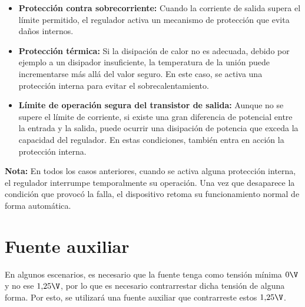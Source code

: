   \begin{itemize}
      \item \textbf{Protección contra sobrecorriente:} Cuando la corriente de salida supera el límite permitido, 
        el regulador activa un mecanismo de protección que evita daños internos.

      \item \textbf{Protección térmica:} Si la disipación de calor no es adecuada, debido por ejemplo a un 
        disipador insuficiente, la temperatura de la unión puede incrementarse más allá del valor seguro. En este caso, se activa una protección interna para evitar el sobrecalentamiento.

      \item \textbf{Límite de operación segura del transistor de salida:} Aunque no se supere el límite de 
        corriente, si existe una gran diferencia de potencial entre la entrada y la salida, puede ocurrir una 
        disipación de potencia que exceda la capacidad del regulador. En estas condiciones, también entra en 
        acción la protección interna.
  \end{itemize}
 
  \textbf{Nota:} En todos los casos anteriores, cuando se activa alguna protección interna, el regulador 
    interrumpe temporalmente su operación. Una vez que desaparece la condición que provocó la falla, el 
    dispositivo retoma su funcionamiento normal de forma automática.

\section{Fuente auxiliar}
  En algunos escenarios, es necesario que la fuente tenga como tensión mínima $0\V$ y no ese $1{,}25\V$, por lo
  que es necesario contrarrestar dicha tensión de alguna forma. Por esto, se utilizará una fuente auxiliar
  que contrarreste estos $1{,}25\V$.
